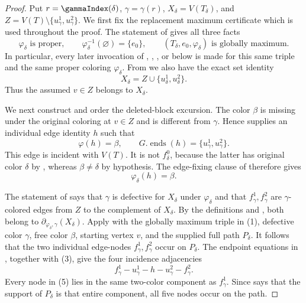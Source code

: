 \begin{proof}
Put $r=\gammaIndex(\delta)$, $\gamma=\gamma(r)$,
$X_\delta=V(T_\delta)$, and
$Z=V(T)\setminus\{u^1_\gamma,u^2_\gamma\}$.  We first fix the
replacement maximum certificate which is used throughout the proof.
The statement of  gives all three
facts
\[
 \varphi_\delta\text{ is proper},\qquad
 \varphi_\delta^{-1}(\varnothing)=\{e_0\},\qquad
 (T_\delta,e_0,\varphi_\delta)\text{ is globally maximum}.       \tag{1}
\]
In particular, every later invocation of
,
,
, or
 below is made for this same triple and the
same proper coloring $\varphi_\delta$.  From
 we also have the exact set identity
\[
                 X_\delta=Z\cup\{u^1_\delta,u^2_\delta\}.        \tag{2}
\]
Thus the assumed $v\in Z$ belongs to $X_\delta$.

We next construct and order the deleted-block excursion.  The color
$\beta$ is missing under the original coloring at $v\in Z$ and is
different from $\gamma$.  Hence
 supplies an individual edge
identity $h$ such that
\[
 \varphi(h)=\beta,
 \qquad G.\operatorname{ends}(h)=
        \{u^1_\gamma,u^2_\gamma\}.                              \tag{3}
\]
This edge is incident with $V(T)$.  It is not $f^0_\delta$, because the
latter has original color $\delta$ by
, whereas $\beta\ne\delta$ by hypothesis.
The edge-fixing clause of 
therefore gives
\[
                         \varphi_\delta(h)=\beta.                \tag{4}
\]

The statement of
 says that
$\gamma$ is defective for $X_\delta$ under $\varphi_\delta$ and that
$f^1_\gamma,f^2_\gamma$ are $\gamma$-colored edges from $Z$ to the
complement of $X_\delta$.  By the definitions
 and , both belong to
$\partial_{\varphi_\delta,\gamma}(X_\delta)$.  Apply
 with the globally maximum
triple in (1), defective color $\gamma$, free color $\beta$, starting
vertex $v$, and the supplied full path $P_\delta$.  It follows that the
two individual edge-nodes $f^1_\gamma,f^2_\gamma$ occur on $P_\delta$.
The endpoint equations in ,
together with (3), give the four incidence adjacencies
\[
 f^1_\gamma-u^1_\gamma-h-u^2_\gamma-f^2_\gamma.                \tag{5}
\]
Every node in (5) lies in the same two-color component as
$f^1_\gamma$.  Since  says that the
support of $P_\delta$ is that entire component, all five nodes occur on
the path.


\end{proof}
